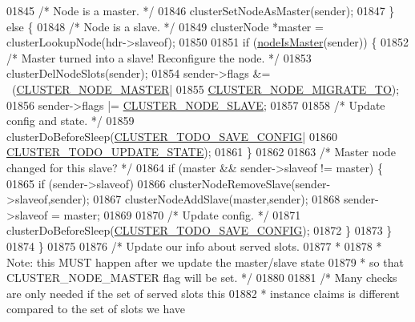 \begin{DoxyCode}
{{{{{{{{{{{{{{{{{{{{{{{{{{{{{{01845                 \textcolor{comment}{/* Node is a master. */}
01846                 clusterSetNodeAsMaster(sender);
01847             \} \textcolor{keywordflow}{else} \{
01848                 \textcolor{comment}{/* Node is a slave. */}
01849                 clusterNode *master = clusterLookupNode(hdr->slaveof);
01850 
01851                 \textcolor{keywordflow}{if} (\hyperlink{cluster_8h_a2d8e84269474d8750565fb3fb67aa436}{nodeIsMaster}(sender)) \{
01852                     \textcolor{comment}{/* Master turned into a slave! Reconfigure the node. */}
01853                     clusterDelNodeSlots(sender);
01854                     sender->flags &= ~(\hyperlink{cluster_8h_a5dcea846e31b55b73244aa2e496a31bf}{CLUSTER\_NODE\_MASTER}|
01855                                        \hyperlink{cluster_8h_a1d5a62356ed9f5986613c2315a358119}{CLUSTER\_NODE\_MIGRATE\_TO});
01856                     sender->flags |= \hyperlink{cluster_8h_a34b7bfd1f810397be68c3b5d13d4d134}{CLUSTER\_NODE\_SLAVE};
01857 
01858                     \textcolor{comment}{/* Update config and state. */}
01859                     clusterDoBeforeSleep(\hyperlink{cluster_8h_a0ae5ff08fbae3c655012b4de8bfc327d}{CLUSTER\_TODO\_SAVE\_CONFIG}|
01860                                          \hyperlink{cluster_8h_abea0d393cba342261e4a7e6fb745f388}{CLUSTER\_TODO\_UPDATE\_STATE});
01861                 \}
01862 
01863                 \textcolor{comment}{/* Master node changed for this slave? */}
01864                 \textcolor{keywordflow}{if} (master && sender->slaveof != master) \{
01865                     \textcolor{keywordflow}{if} (sender->slaveof)
01866                         clusterNodeRemoveSlave(sender->slaveof,sender);
01867                     clusterNodeAddSlave(master,sender);
01868                     sender->slaveof = master;
01869 
01870                     \textcolor{comment}{/* Update config. */}
01871                     clusterDoBeforeSleep(\hyperlink{cluster_8h_a0ae5ff08fbae3c655012b4de8bfc327d}{CLUSTER\_TODO\_SAVE\_CONFIG});
01872                 \}
01873             \}
01874         \}
01875 
01876         \textcolor{comment}{/* Update our info about served slots.}
01877 \textcolor{comment}{         *}
01878 \textcolor{comment}{         * Note: this MUST happen after we update the master/slave state}
01879 \textcolor{comment}{         * so that CLUSTER\_NODE\_MASTER flag will be set. */}
01880 
01881         \textcolor{comment}{/* Many checks are only needed if the set of served slots this}
01882 \textcolor{comment}{         * instance claims is different compared to the set of slots we have}
}}}}}}}}}}}}}}}}}}}}}}}}}}}}}}
\end{DoxyCode}
